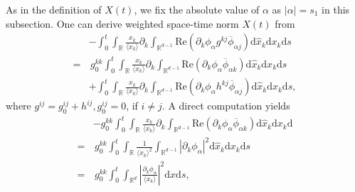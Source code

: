 \documentclass[10pt,twoside,a4paper]{article}
\numberwithin{equation}{section}\allowdisplaybreaks
\def\geq{\geqslant}
\begin{document}
As in the definition of $ X(t) $, we fix the absolute value of $ \alpha $ as $|\alpha| = s_1$ in this subsection.
 One can derive weighted space-time norm  $ X(t) $ from
\begin{align} \label{qener_mc2}
	&-\int_0^t\int_{\mathbb{R}}    	\frac{x_k}{\langle x_k\rangle}   \partial_k \int_{\mathbb{R}^{d-1}} \mathrm{Re}\left(\partial_k \phi_{\alpha } g^{kj} \overline{\phi}_{\alpha j}\right) \mathrm{d} \hat{x}_k  \mathrm{d} x_k \mathrm{d} s\nonumber\\
	=&\,g^{kk}_0\int_0^t\int_{\mathbb{R}}    	\frac{x_k}{\langle x_k\rangle}   \partial_k \int_{\mathbb{R}^{d-1}} \mathrm{Re}\left(\partial_k \phi_{\alpha }   \overline{\phi}_{\alpha k}\right) \mathrm{d} \hat{x}_k  \mathrm{d} x_k \mathrm{d} s\\
	&+\int_0^t\int_{\mathbb{R}}    	\frac{x_k}{\langle x_k\rangle}   \partial_k \int_{\mathbb{R}^{d-1}} \mathrm{Re}\left(\partial_k \phi_{\alpha } h^{kj} \overline{\phi}_{\alpha j}\right) \mathrm{d} \hat{x}_k  \mathrm{d} x_k \mathrm{d} s,\nonumber
\end{align}
where 
 $ g^{ij}=g^{ij}_0+h^{ij}, g^{ij}_0=0 $, if $ i\neq j $.  A direct computation yields
\begin{align} \label{qener_mc2_1}
	&-g^{kk}_0\int_0^t\int_{\mathbb{R}}  	\frac{x_k}{\langle x_k\rangle}   \partial_k \int_{\mathbb{R}^{d-1}} \mathrm{Re}\left(\partial_k \phi_{\alpha }  \overline{\phi}_{\alpha k}\right) \mathrm{d} \hat{x}_k  \mathrm{d} x_k \mathrm{d} \nonumber\\
	=&\, g^{kk}_0\int_0^t\int_{\mathbb{R}}      \frac{ 1 }{\langle x_k\rangle^2}   \int_{\mathbb{R}^{d-1}} \left|\partial_k \phi_{\alpha }  \right|^2\mathrm{d} \hat{x}_k  \mathrm{d} x_k \mathrm{d} s\\
	=&\, g^{kk}_0\int_0^t     \int_{\mathbb{R}^{d}} \left|\frac{\partial_k \phi_{\alpha }  } {\langle x_k\rangle}\right|^2  \mathrm{d} x \mathrm{d} s,\nonumber
\end{align}
\end{document}
